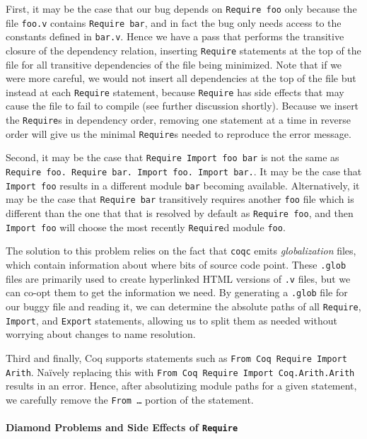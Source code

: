 \documentclass[a4paper,USenglish,cleveref,autoref,thm-restate]{lipics-v2021}
\begin{document}
First, it may be the case that our bug depends on \verb|Require foo| only because the file \verb|foo.v| contains \verb|Require bar|, and in fact the bug only needs access to the constants defined in \verb|bar.v|.
Hence we have a pass that performs the transitive closure of the dependency relation, inserting \verb|Require| statements at the top of the file for all transitive dependencies of the file being minimized.
Note that if we were more careful, we would not insert all dependencies at the top of the file but instead at each \verb|Require| statement, because \verb|Require| has side effects that may cause the file to fail to compile (see further discussion shortly).
Because we insert the \verb|Require|s in dependency order, removing one statement at a time in reverse order will give us the minimal \verb|Require|s needed to reproduce the error message.

Second, it may be the case that \verb|Require Import foo bar| is not the same as \texttt{Require foo. Require bar. Import foo. Import bar.}.
It may be the case that \verb|Import foo| results in a different module \verb|bar| becoming available.
Alternatively, it may be the case that \verb|Require bar| transitively requires another \verb|foo| file which is different than the one that that is resolved by default as \verb|Require foo|, and then \verb|Import foo| will choose the most recently \verb|Require|d module \verb|foo|.

The solution to this problem relies on the fact that \verb|coqc| emits \emph{globalization} files, which contain information about where bits of source code point.
These \verb|.glob| files are primarily used to create hyperlinked HTML versions of \verb|.v| files, but we can co-opt them to get the information we need.
By generating a \verb|.glob| file for our buggy file and reading it, we can determine the absolute paths of all \verb|Require|, \verb|Import|, and \verb|Export| statements, allowing us to split them as needed without worrying about changes to name resolution.

Third and finally, Coq supports statements such as \verb|From Coq Require Import Arith|.
Na\"ively replacing this with \verb|From Coq Require Import Coq.Arith.Arith| results in an error.
Hence, after absolutizing module paths for a given statement, we carefully remove the \texttt{From \ldots} portion of the statement.


\paragraph{Diamond Problems and Side Effects of \texttt{Require}}
\end{document}
